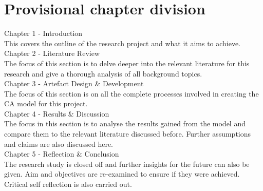 \section{Provisional chapter division}
Chapter 1 - Introduction\\
This covers the outline of the research project and what it aims to achieve.\\
Chapter 2 - Literature Review\\
The focus of this section is to delve deeper into the relevant literature for this research and give a thorough analysis of all background topics.\\
Chapter 3 - Artefact Design \& Development\\
The focus of this section is on all the complete processes involved in creating the CA model for this project.\\
Chapter 4 - Results \& Discussion\\
The focus in this section is to analyse the results gained from the model and compare them to the relevant literature discussed before. Further assumptions and claims are also discussed here.\\
Chapter 5 - Reflection \& Conclusion\\
The research study is closed off and further insights for the future can also be given. Aim and objectives are re-examined to ensure if they were achieved. Critical self reflection is also carried out.